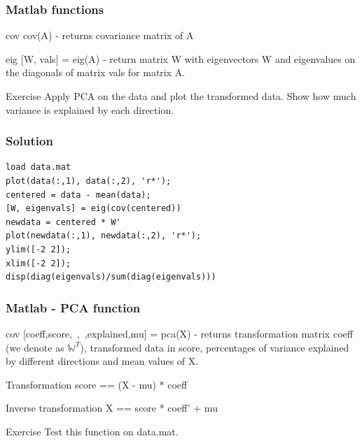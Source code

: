 \documentclass{beamer}
\begin{document}
\begin{frame}
\frametitle{Matlab functions}

\begin{block}{cov}
cov(A) - returns covariance matrix of A
\end{block}

\begin{block}{eig}
[W, vals] = eig(A) - return matrix W with eigenvectors W and eigenvalues on the diagonals of matrix vals for matrix A.
\end{block}

\begin{block}{Exercise}
Apply PCA on the data and plot the transformed data. Show how much variance is explained by each direction.
\end{block}
\end{frame}

\begin{frame}[fragile]
\frametitle{Solution}
\begin{verbatim}
load data.mat
plot(data(:,1), data(:,2), 'r*');
centered = data - mean(data);
[W, eigenvals] = eig(cov(centered))
newdata = centered * W'
plot(newdata(:,1), newdata(:,2), 'r*');
ylim([-2 2]);
xlim([-2 2]);
disp(diag(eigenvals)/sum(diag(eigenvals)))
\end{verbatim}
\end{frame}

\begin{frame}
\frametitle{Matlab - PCA function}

\begin{block}{cov}
[coeff,score,~,~,explained,mu] = pca(X) - returns transformation matrix coeff (we denote as $\mathbb{W}^T$), transformed data in score, percentages of variance explained by different directions and mean values of X.

\end{block}

\begin{block}{Transformation}
score == (X - mu) * coeff
\end{block}

\begin{block}{Inverse transformation}
X == score * coeff' + mu
\end{block}

\begin{block}{Exercise}
Test this function on data.mat.
\end{block}

\end{frame}
\end{document}
